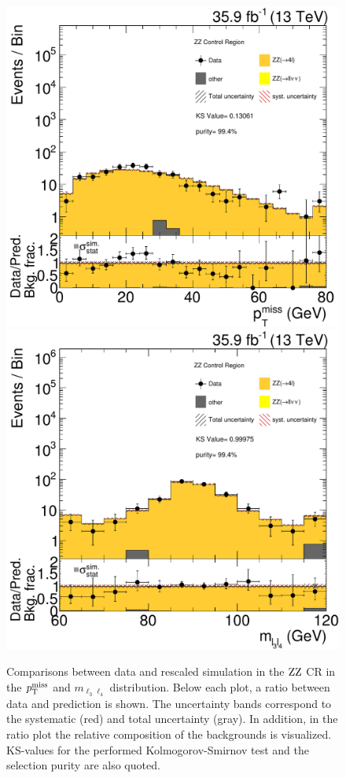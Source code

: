 \begin{figure}[tbp]
 \centering
 \includegraphics[width=\pairwidth]{figures/plots_CR_zz/CRZZ_LL_nom_met_log2}
 \includegraphics[width=\pairwidth]{figures/plots_CR_zz/CRZZ_LL_nom_m_ll2_log2}
 \caption{Comparisons between data and rescaled simulation in the $\mathrm{Z}\mathrm{Z}$ CR in the $p_{\mathrm{T}}^\text{miss}$ and $m_{\ell_3\ell_4}$ distribution. Below each plot, a ratio between data and prediction is shown. The uncertainty bands correspond to the systematic (red) and total uncertainty (gray). In addition, in the ratio plot the relative composition of the backgrounds is visualized. KS-values for the performed Kolmogorov-Smirnov test and the selection purity are also quoted.}
 \label{fig:CRZZ}
\end{figure}
